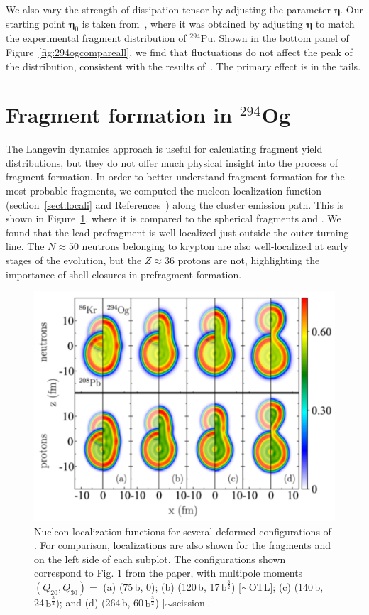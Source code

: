 We also vary the strength of dissipation tensor by adjusting the parameter $\mathbf{\eta}$. Our starting point $\mathbf{\eta}_0$ is taken from~\cite{Sadhukhan2016}, where it was obtained by adjusting $\mathbf{\eta}$ to match the experimental fragment distribution of $^{294}$Pu. Shown in the bottom panel of Figure~\ref{fig:294ogcompareall}, we find that fluctuations do not affect the peak of the distribution, consistent with the results of~\cite{Randrup2011,Sierk2017,Sadhukhan2017}. The primary effect is in the tails.

\section{Fragment formation in $^{294}$Og}

The Langevin dynamics approach is useful for calculating fragment yield distributions, but they do not offer much physical insight into the process of fragment formation. In order to better understand fragment formation for the most-probable fragments, we computed the nucleon localization function (section~\ref{sect:locali} and References~\cite{Zhang2016,Sadhukhan2017}) along the cluster emission path. This is shown in Figure~\ref{fig:294oglocali}, where it is compared to the spherical fragments {\Pb} and {\Kr}. We found that the lead prefragment is well-localized just outside the outer turning line. The $N\approx50$ neutrons belonging to krypton are also well-localized at early stages of the evolution, but the $Z\approx36$ protons are not, highlighting the importance of shell closures in prefragment formation.

\begin{figure}
	\centering
	\includegraphics[width=0.9\linewidth]{TeX_files/294Og_locali}
	\caption[Nucleon localization visualization of $^{294}$Og prefragment formation.]{Nucleon localization functions for several deformed configurations of {\Og}. For comparison, localizations are also shown for the fragments {\Pb} and {\Kr} on the left side of each subplot. The configurations shown correspond to Fig. 1 from the paper, with multipole moments $(Q_{20}, Q_{30})=$ (a) (75\,b, 0); (b) (120\,b, 17\,$\mathrm{b}^\frac{3}{2}$) [${\sim}$OTL]; (c) (140\,b, 24\,$\mathrm{b}^\frac{3}{2}$); and (d) (264\,b, 60\,$\mathrm{b}^\frac{3}{2}$) [${\sim}$scission].}
	\label{fig:294oglocali}
\end{figure}

